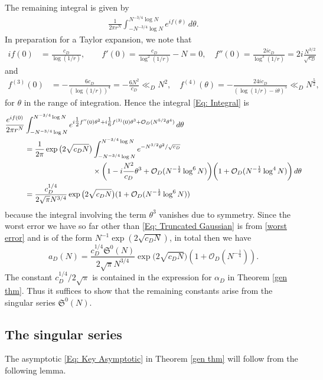 \documentclass[11pt]{amsart}
\numberwithin{equation}{section}
\newcommand{\mf}{\mathfrak}
\newcommand{\n}{\mf{n}_D}
\theoremstyle{remark}
\begin{document}
The remaining integral is given by 
\begin{align}\label{Eq: Integral}
\frac{1}{2\pi r^N}\int_{-N^{-3/4}\log N}^{N^{-3/4}\log N} e^{if(\theta)} \, d\theta.
\end{align}
In preparation for a Taylor expansion, we note that
\begin{align*}
if(0)&=\frac{c_D}{\log(1/r)},\qquad
f'(0)=  \frac{c_D}{\log^2(1/r)}-N=0, \quad f''(0)= \frac{2ic_D}{\log^3(1/r)} = 2i\frac{N^{3/2}}{\sqrt{c_D}}
\end{align*}
and 
\begin{align*}
f^{(3)}(0)&= -\frac{6c_D}{(\log(1/r))^4} = -\frac{6N^2}{c_D}\ll_D N^2, \quad f^{(4)}(\theta)= -\frac{24 i c_D}{(\log(1/r)-i\theta)^5}\ll_D N^{\frac52},
\end{align*}
for $\theta$ in the range of integration. Hence the integral \eqref{Eq: Integral} is 
\begin{align}\label{Eq: Truncated Gaussian}
\frac{e^{if(0)}}{2\pi r^N}
&\int_{-N^{-3/4}\log N}^{N^{-3/4}\log N}
e^{i\tfrac12 f''(0)\theta^2+i\tfrac16 f^{(3)}(0)\theta^3+\mathcal{O}_D(N^{5/2}\theta^4)} \, d\theta
\notag \\
&=
\frac{1}{2\pi}\exp\big(2\sqrt{c_DN}\big)
\int_{-N^{-3/4}\log N}^{N^{-3/4}\log N}e^{-N^{3/2}\theta^2/\sqrt{c_D}} \notag \\
&\quad \quad \quad\quad\quad\quad\quad\quad\quad \times \bigg (1-i\frac{N^2}{c_D} \theta^3+\mathcal{O}_D(N^{-\frac12}\log^6N)\bigg) \bigg(1+\mathcal{O}_D(N^{-\frac12}\log^4N)\bigg)\, d\theta
\notag \\
&=
\frac{c_D^{1/4}}{2\sqrt{\pi}N^{3/4}}\exp\big(2\sqrt{c_DN}\big)(1+\mathcal{O}_D(N^{-\frac12}\log^6N))
\end{align}
because the integral involving the term $\theta^3$ vanishes due to symmetry. Since the worst error we have so far other than \eqref{Eq: Truncated Gaussian} is from \eqref{worst error} and is of the form $N^{-1}\exp(2\sqrt{c_DN})$, in total then we have 
\begin{equation}\label{a}
a_D(N)
=
\frac{c_D^{1/4}\mf{S}^{0}(N)}{2\sqrt{\pi}N^{3/4}}\exp\big(2\sqrt{c_DN}\big)(1+\mathcal{O}_D(N^{-\frac14})).
\end{equation}
The constant $c_D^{1/4}/2\sqrt{\pi}$ is contained in the expression for $\alpha_D$ in Theorem \ref{gen thm}. Thus it suffices to show that the remaining constants arise from the singular series $\mf{S}^{0}(N)$.


\subsection{The singular series} The asymptotic \eqref{Eq: Key Asymptotic} in Theorem \ref{gen thm} will follow from the following lemma. 

\end{document}
